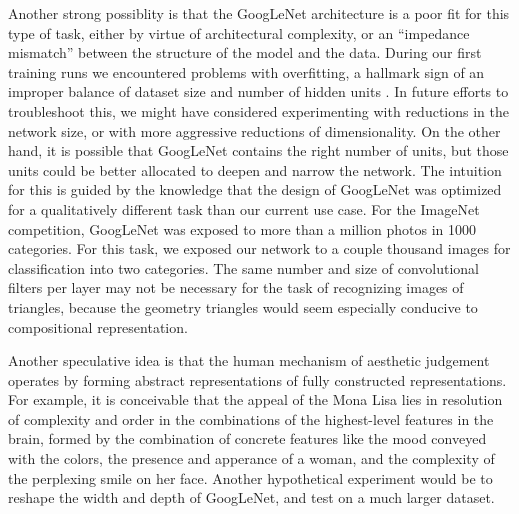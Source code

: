 \documentclass[midd]{thesis}
\begin{document}

Another strong possiblity is that the GoogLeNet architecture is a poor fit for this type of task, either by virtue of architectural complexity, or an ``impedance mismatch'' between the structure of the model and the data. During our first training runs we encountered problems with overfitting, a hallmark sign of an improper balance of dataset size and number of hidden units \cite{lecun1989generalization}. In future efforts to troubleshoot this, we might have considered experimenting with reductions in the network size, or with more aggressive reductions of dimensionality. On the other hand, it is possible that GoogLeNet contains the right number of units, but those units could be better allocated to deepen and narrow the network. The intuition for this is guided by the knowledge that the design of GoogLeNet was optimized for a qualitatively different task than our current use case. For the ImageNet competition, GoogLeNet was exposed to more than a million photos in 1000 categories. For this task, we exposed our network to a couple thousand images for classification into two categories. The same number and size of convolutional filters per layer may not be necessary for the task of recognizing images of triangles, because the geometry triangles would seem especially conducive to compositional representation.

Another speculative idea is that the human mechanism of aesthetic judgement operates by forming abstract representations of fully constructed representations. For example, it is conceivable that the appeal of the Mona Lisa lies in resolution of complexity and order in the combinations of the highest-level features in the brain, formed by the combination of concrete features like the mood conveyed with the colors, the presence and apperance of a woman, and the complexity of the perplexing smile on her face. Another hypothetical experiment would be to reshape the width and depth of GoogLeNet, and test on a much larger dataset.
\end{document}
